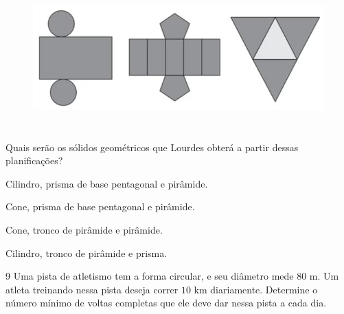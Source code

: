 {{{{\begin{figure}[H]
\includegraphics[width=5.90625in,height=2.125in]{./imgSAEB_6_MAT/media/image51.png}
\end{figure}

Quais serão os sólidos geométricos que Lourdes obterá a partir dessas
planificações?

\begin{escolha}
\item Cilindro, prisma de base pentagonal e pirâmide. 
\item Cone, prisma de base pentagonal e pirâmide.
\item Cone, tronco de pirâmide e pirâmide.
\item Cilindro, tronco de pirâmide e prisma.
\end{escolha}

\num{9}  Uma pista de atletismo tem a forma circular, e seu diâmetro mede $80$ m.
Um atleta treinando nessa pista deseja correr $10$ km diariamente.
Determine o número mínimo de voltas completas que ele deve dar nessa
pista a cada dia.








}}}}
